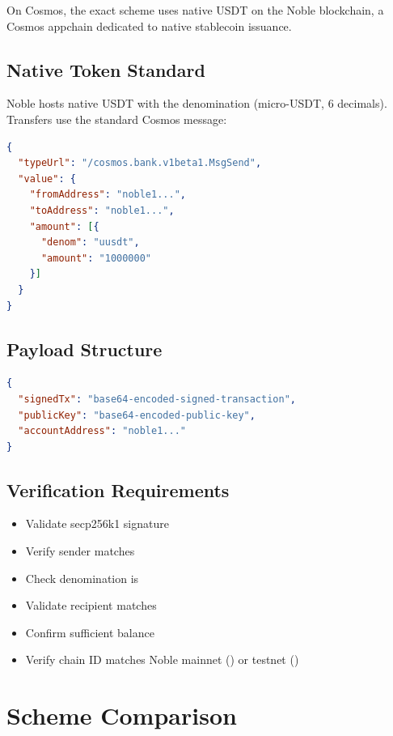 On Cosmos, the exact scheme uses native USDT on the Noble blockchain, a Cosmos appchain dedicated to native stablecoin issuance.

\subsection{Native Token Standard}

Noble hosts native USDT with the  denomination (micro-USDT, 6 decimals). Transfers use the standard Cosmos  message:

\begin{lstlisting}[language=json,caption={Cosmos bank send message}]
{
  "typeUrl": "/cosmos.bank.v1beta1.MsgSend",
  "value": {
    "fromAddress": "noble1...",
    "toAddress": "noble1...",
    "amount": [{
      "denom": "uusdt",
      "amount": "1000000"
    }]
  }
}
\end{lstlisting}

\subsection{Payload Structure}

\begin{lstlisting}[language=json,caption={Cosmos exact scheme payload}]
{
  "signedTx": "base64-encoded-signed-transaction",
  "publicKey": "base64-encoded-public-key",
  "accountAddress": "noble1..."
}
\end{lstlisting}

\subsection{Verification Requirements}

\begin{itemize}
    \item Validate secp256k1 signature
    \item Verify sender matches 
    \item Check denomination is 
    \item Validate recipient matches 
    \item Confirm sufficient balance
    \item Verify chain ID matches Noble mainnet () or testnet ()
\end{itemize}

\section{Scheme Comparison}
\label{sec:scheme-comparison}


